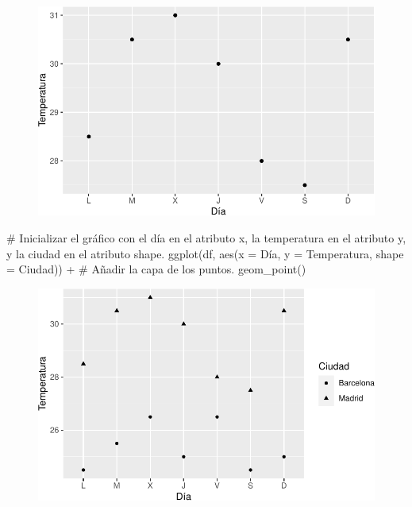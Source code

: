 \documentclass[
  a4paper,
]{scrreport}
\newenvironment{Shaded}{\begin{snugshade}}{\end{snugshade}}
\newcommand{\AttributeTok}[1]{\textcolor[rgb]{0.40,0.45,0.13}{#1}}
\newcommand{\CommentTok}[1]{\textcolor[rgb]{0.37,0.37,0.37}{#1}}
\newcommand{\FunctionTok}[1]{\textcolor[rgb]{0.28,0.35,0.67}{#1}}
\newcommand{\NormalTok}[1]{\textcolor[rgb]{0.00,0.23,0.31}{#1}}
\newcommand{\SpecialCharTok}[1]{\textcolor[rgb]{0.37,0.37,0.37}{#1}}
\theoremstyle{definition}
\theoremstyle{definition}
\theoremstyle{remark}
\begin{document}
\begin{figure}[H]

{\centering \includegraphics{07-graficos_files/figure-pdf/unnamed-chunk-1-1.pdf}

}

\end{figure}

\begin{Shaded}
\begin{Highlighting}[]
\CommentTok{\# Inicializar el gráfico con el día en el atributo x, la temperatura en el atributo y, y la ciudad en el atributo shape.}
\FunctionTok{ggplot}\NormalTok{(df, }\FunctionTok{aes}\NormalTok{(}\AttributeTok{x =}\NormalTok{ Día, }\AttributeTok{y =}\NormalTok{ Temperatura, }\AttributeTok{shape =}\NormalTok{ Ciudad)) }\SpecialCharTok{+}
\CommentTok{\# Añadir la capa de los puntos.}
    \FunctionTok{geom\_point}\NormalTok{()}
\end{Highlighting}
\end{Shaded}

\begin{figure}[H]

{\centering \includegraphics{07-graficos_files/figure-pdf/unnamed-chunk-2-1.pdf}

}

\end{figure}
\end{document}
